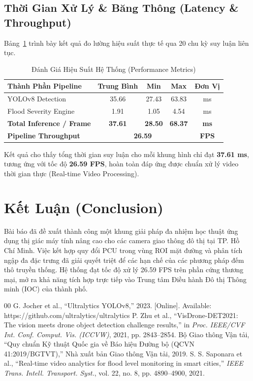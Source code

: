 \documentclass[conference]{IEEEtran}
\begin{document}
\subsection{Thời Gian Xử Lý \& Băng Thông (Latency \& Throughput)}
Bảng~\ref{tab:performance} trình bày kết quả đo lường hiệu suất thực tế qua 20 chu kỳ suy luận liên tục.

\begin{table}[htbp]
\caption{Đánh Giá Hiệu Suất Hệ Thống (Performance Metrics)}
\label{tab:performance}
\centering
\begin{tabular}{lcccc}
\toprule
\textbf{Thành Phần Pipeline} & \textbf{Trung Bình} & \textbf{Min} & \textbf{Max} & \textbf{Đơn Vị} \\
\midrule
YOLOv8 Detection & 35.66 & 27.43 & 63.83 & ms \\
Flood Severity Engine & 1.91 & 1.05 & 4.54 & ms \\
\textbf{Total Inference / Frame} & \textbf{37.61} & \textbf{28.50} & \textbf{68.37} & \textbf{ms} \\
\midrule
\textbf{Pipeline Throughput} & \multicolumn{3}{c}{\textbf{26.59}} & \textbf{FPS} \\
\bottomrule
\end{tabular}
\end{table}

Kết quả cho thấy tổng thời gian suy luận cho mỗi khung hình chỉ đạt \textbf{37.61 ms}, tương ứng với tốc độ \textbf{26.59 FPS}, hoàn toàn đáp ứng được chuẩn xử lý video thời gian thực (Real-time Video Processing).

\section{Kết Luận (Conclusion)}
Bài báo đã đề xuất thành công một khung giải pháp đa nhiệm học thuật ứng dụng thị giác máy tính nâng cao cho các camera giao thông đô thị tại TP. Hồ Chí Minh. Việc kết hợp quy đổi PCU trong vùng ROI mặt đường và phân tích ngập đa đặc trưng đã giải quyết triệt để các hạn chế của các phương pháp đếm thô truyền thống. Hệ thống đạt tốc độ xử lý 26.59 FPS trên phần cứng thương mại, mở ra khả năng tích hợp trực tiếp vào Trung tâm Điều hành Đô thị Thông minh (IOC) của thành phố.

\begin{thebibliography}{00}
 G. Jocher et al., ``Ultralytics YOLOv8,'' 2023. [Online]. Available: https://github.com/ultralytics/ultralytics
 P. Zhu et al., ``VisDrone-DET2021: The vision meets drone object detection challenge results,'' in \textit{Proc. IEEE/CVF Int. Conf. Comput. Vis. (ICCVW)}, 2021, pp. 2843--2854.
 Bộ Giao thông Vận tải, ``Quy chuẩn Kỹ thuật Quốc gia về Báo hiệu Đường bộ (QCVN 41:2019/BGTVT),'' Nhà xuất bản Giao thông Vận tải, 2019.
 S. S. Saponara et al., ``Real-time video analytics for flood level monitoring in smart cities,'' \textit{IEEE Trans. Intell. Transport. Syst.}, vol. 22, no. 8, pp. 4890--4900, 2021.
\end{thebibliography}
\end{document}
